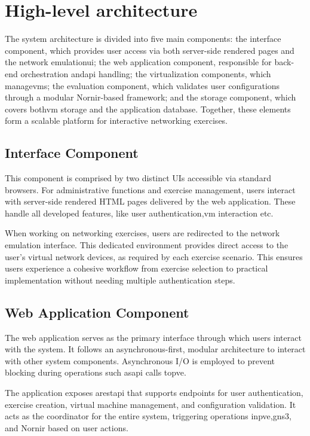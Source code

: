 \section{High-level architecture}
    The system architecture is divided into five main components: the interface component, which provides user access via both server-side rendered pages 
    and the network emulation\ac{ui}; the web application component, responsible for back-end orchestration and\ac{api} handling; the virtualization components, 
    which manage\ac{vm}s; the evaluation component, which validates user configurations through a modular Nornir-based framework; and the storage component, 
    which covers both\ac{vm} storage and the application database. Together, these elements form a scalable platform for interactive networking exercises.
    
    \subsection{Interface Component}
        This component is comprised by two distinct UIs accessible via standard browsers. For administrative functions and exercise management, 
        users interact with server-side rendered HTML pages delivered by the web application. These handle all developed features, like user 
        authentication,\ac{vm} interaction etc.

        When working on networking exercises, users are redirected to the network emulation interface. This dedicated environment provides direct 
        access to the user's virtual network devices, as required by each exercise scenario. This ensures users experience a cohesive workflow from 
        exercise selection to practical implementation without needing multiple authentication steps.

    \subsection{Web Application Component}

        The web application serves as the primary interface through which users interact with the system. It follows an asynchronous-first, 
        modular architecture to interact with other system components. Asynchronous I/O is employed to prevent blocking during operations 
        such as\ac{api} calls to\ac{pve}.

        The application exposes a\ac{rest}\ac{api} that supports endpoints for user authentication, exercise creation, virtual 
        machine management, and configuration validation. It acts as the coordinator for the entire system, triggering operations 
        in\ac{pve},\ac{gns3}, and Nornir based on user actions.

